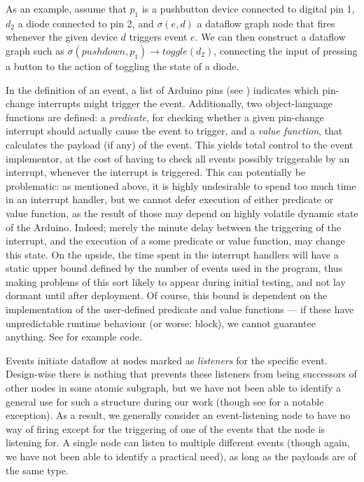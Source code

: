 \documentclass[a4paper, oneside, final]{memoir}
\let\Fref\undefined
\begin{document}
As an example, assume that $p_1$ is a pushbutton device connected to
digital pin 1, $d_2$ a diode connected to pin 2, and $\sigma(e,d)$ a
dataflow graph node that fires whenever the given device $d$ triggers
event $e$.  We can then construct a dataflow graph such as
$\sigma(pushdown,p_1) \rightarrow toggle(d_2)$, connecting the input
of pressing a button to the action of toggling the state of a diode.

In the definition of an event, a list of Arduino pins (see \Fref{sec:pins})
indicates which pin-change interrupts might trigger the event.
Additionally, two object-language functions are defined: a
\textit{predicate}, for checking whether a given pin-change interrupt
should actually cause the event to trigger, and a
\textit{value function}, that calculates the payload (if any) of the
event.  This yields total control to the event implementor, at the
cost of having to check all events possibly triggerable by an
interrupt, whenever the interrupt is triggered.  This can potentially
be problematic: as mentioned above, it is highly undesirable to spend
too much time in an interrupt handler, but we cannot defer execution
of either predicate or value function, as the result of those may
depend on highly volatile dynamic state of the Arduino.  Indeed;
merely the minute delay between the triggering of the interrupt, and
the execution of a some predicate or value function, may change this
state.  On the upside, the time spent in the interrupt handlers will
have a static upper bound defined by the number of events used in the
program, thus making problems of this sort likely to appear during
initial testing, and not lay dormant until after deployment.  Of
course, this bound is dependent on the implementation of the
user-defined predicate and value functions --- if these have
unpredictable runtime behaviour (or worse: block), we cannot guarantee
anything.  See \Fref{sec:pushbuttondef} for example code.

Events initiate dataflow at nodes marked as \textit{listeners} for the
specific event.  Design-wise there is nothing that prevents these
listeners from being successors of other nodes in some atomic
subgraph, but we have not been able to identify a general use for such a
structure during our work (though see \Fref{sec:postingwireimpl} for a
notable exception).  As a result, we generally consider an
event-listening node to have no way of firing except for the
triggering of one of the events that the node is listening for.  A
single node can listen to multiple different events (though again, we
have not been able to identify a practical need), as long as the
payloads are of the same type.
\end{document}
